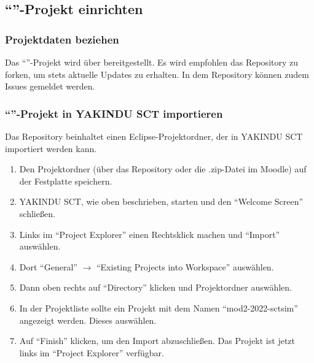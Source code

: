 




\subsection{\enquote{}-Projekt einrichten}
\label{subsec:import}

\subsubsection{Projektdaten beziehen}

Das \enquote{}-Projekt wird über  bereitgestellt.
Es wird empfohlen das Repository zu forken, um stets aktuelle Updates zu erhalten.
In dem Repository können zudem Issues gemeldet werden.



\subsubsection{\enquote{}-Projekt in YAKINDU SCT importieren}


Das Repository beinhaltet einen Eclipse-Projektordner, der in YAKINDU SCT importiert werden kann.

\begin{enumerate}
	\setlength\topsep{-1em}
	\setlength\itemsep{-0.5em}
	\item Den Projektordner (über das Repository oder die .zip-Datei im Moodle) auf der Festplatte speichern.
	\item YAKINDU SCT, wie oben beschrieben, starten und den \enquote{Welcome Screen} schließen.
	\item Links im \enquote{Project Explorer} einen Rechtsklick machen und \enquote{Import} auswählen.
	\item Dort \enquote{General} $\rightarrow$ \enquote{Existing Projects into Workspace} auswählen.
	\item Dann oben rechts auf \enquote{Directory} klicken und Projektordner auswählen.
	\item In der Projektliste sollte ein Projekt mit dem Namen \enquote{mod2-2022-sctsim} angezeigt werden. Dieses auswählen.
	\item Auf \enquote{Finish} klicken, um den Import abzuschließen. Das Projekt ist jetzt links im \enquote{Project Explorer} verfügbar.
\end{enumerate}



